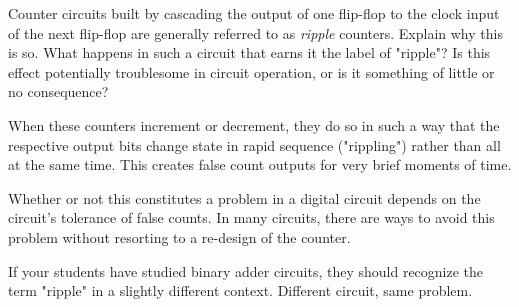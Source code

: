 

Counter circuits built by cascading the output of one flip-flop to the clock input of the next flip-flop are generally referred to as {\it ripple} counters.  Explain why this is so.  What happens in such a circuit that earns it the label of "ripple"?  Is this effect potentially troublesome in circuit operation, or is it something of little or no consequence?







When these counters increment or decrement, they do so in such a way that the respective output bits change state in rapid sequence ("rippling") rather than all at the same time.  This creates false count outputs for very brief moments of time.

Whether or not this constitutes a problem in a digital circuit depends on the circuit's tolerance of false counts.  In many circuits, there are ways to avoid this problem without resorting to a re-design of the counter.







If your students have studied binary adder circuits, they should recognize the term "ripple" in a slightly different context.  Different circuit, same problem.




